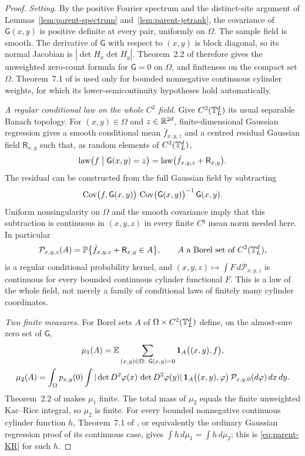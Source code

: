 \begin{proof}
\emph{Setting.} By the positive Fourier spectrum and the distinct-site argument of Lemmas~\ref{lem:parent-spectrum} and~\ref{lem:parent-jetrank}, the covariance of $\mathsf G(x,y)$ is positive definite at every pair, uniformly on $\Omega$. The sample field is smooth. The derivative of $\mathsf G$ with respect to $(x,y)$ is block diagonal, so its normal Jacobian is $|\det H_x\det H_y|$. Theorem~2.2 of \cite{AAL} therefore gives the unweighted zero-count formula for $\mathsf G=0$ on $\Omega$, and finiteness on the compact set $\Omega$. Theorem~7.1 of \cite{AAL} is used only for bounded nonnegative continuous cylinder weights, for which its lower-semicontinuity hypotheses hold automatically.

\emph{A regular conditional law on the whole $C^2$ field.} Give $C^2(\mathbb T^d_L)$ its usual separable Banach topology. For $(x,y)\in\Omega$ and $z\in\mathbb R^{2d}$, finite-dimensional Gaussian regression gives a smooth conditional mean $\bar f_{x,y,z}$ and a centred residual Gaussian field $\mathsf R_{x,y}$ such that, as random elements of $C^2(\mathbb T^d_L)$,
\[
\operatorname{law}\bigl(f\bigm|\mathsf G(x,y)=z\bigr)=\operatorname{law}\bigl(\bar f_{x,y,z}+\mathsf R_{x,y}\bigr).
\]
The residual can be constructed from the full Gaussian field by subtracting
\[
\operatorname{Cov}\bigl(f,\mathsf G(x,y)\bigr)\,\operatorname{Cov}\bigl(\mathsf G(x,y)\bigr)^{-1}\,\mathsf G(x,y).
\]
Uniform nonsingularity on $\Omega$ and the smooth covariance imply that this subtraction is continuous in $(x,y,z)$ in every finite $C^q$ mean norm needed here. In particular
\[
\mathcal P_{x,y,z}(A)=\Prob\bigl\{\bar f_{x,y,z}+\mathsf R_{x,y}\in A\bigr\},\qquad A\ \text{a Borel set of}\ C^2(\T^d_L),
\]
is a regular conditional probability kernel, and $(x,y,z)\mapsto\int F\,d\mathcal P_{x,y,z}$ is continuous for every bounded continuous cylinder functional $F$. This is a law of the whole field, not merely a family of conditional laws of finitely many cylinder coordinates.

\emph{Two finite measures.} For Borel sets $A$ of $\Omega\times C^2(\mathbb T^d_L)$ define, on the almost-sure zero set of $\mathsf G$,
\begin{gather*}
\mu_1(A)=\mathbb E\sum_{(x,y)\in\Omega:\ \mathsf G(x,y)=0}\mathbf 1_A\bigl((x,y),f\bigr),\\
\mu_2(A)=\int_\Omega p_{x,y}(0)\int|\det D^2\varphi(x)\,\det D^2\varphi(y)|\,\mathbf 1_A\bigl((x,y),\varphi\bigr)\,\mathcal P_{x,y,0}(d\varphi)\,dx\,dy .
\end{gather*}
Theorem~2.2 of \cite{AAL} makes $\mu_1$ finite. The total mass of $\mu_2$ equals the finite unweighted Kac--Rice integral, so $\mu_2$ is finite. For every bounded nonnegative continuous cylinder function $h$, Theorem~7.1 of \cite{AAL}, or equivalently the ordinary Gaussian regression proof of its continuous case, gives $\int h\,d\mu_1=\int h\,d\mu_2$; this is \eqref{eq:parent-KR} for such $h$.


\end{proof}

